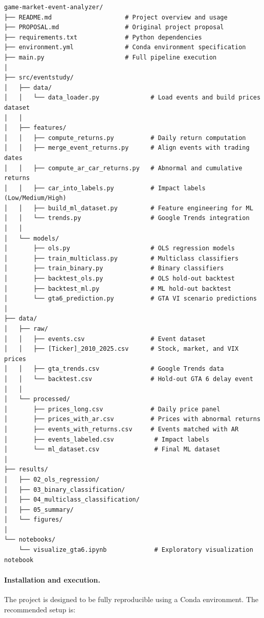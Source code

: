 \documentclass[11pt,a4paper]{article}
\begin{document}
\begin{verbatim}
game-market-event-analyzer/
├── README.md                    # Project overview and usage
├── PROPOSAL.md                  # Original project proposal
├── requirements.txt             # Python dependencies
├── environment.yml              # Conda environment specification
├── main.py                      # Full pipeline execution
│
├── src/eventstudy/
│   ├── data/
│   │   └── data_loader.py              # Load events and build prices dataset
│   │
│   ├── features/
│   │   ├── compute_returns.py          # Daily return computation
│   │   ├── merge_event_returns.py      # Align events with trading dates
│   │   ├── compute_ar_car_returns.py   # Abnormal and cumulative returns
│   │   ├── car_into_labels.py          # Impact labels (Low/Medium/High)
│   │   ├── build_ml_dataset.py         # Feature engineering for ML
│   │   └── trends.py                   # Google Trends integration
│   │
│   └── models/
│       ├── ols.py                      # OLS regression models
│       ├── train_multiclass.py         # Multiclass classifiers
│       ├── train_binary.py             # Binary classifiers
│       ├── backtest_ols.py             # OLS hold-out backtest
│       ├── backtest_ml.py              # ML hold-out backtest
│       └── gta6_prediction.py          # GTA VI scenario predictions
│
├── data/
│   ├── raw/
│   │   ├── events.csv                  # Event dataset
│   │   ├── [Ticker]_2010_2025.csv      # Stock, market, and VIX prices
│   │   ├── gta_trends.csv              # Google Trends data
│   │   └── backtest.csv                # Hold-out GTA 6 delay event
│   │
│   └── processed/
│       ├── prices_long.csv             # Daily price panel
│       ├── prices_with_ar.csv          # Prices with abnormal returns
│       ├── events_with_returns.csv     # Events matched with AR
│       ├── events_labeled.csv           # Impact labels
│       └── ml_dataset.csv               # Final ML dataset
│
├── results/
│   ├── 02_ols_regression/
│   ├── 03_binary_classification/
│   ├── 04_multiclass_classification/
│   ├── 05_summary/
│   └── figures/
│
└── notebooks/
    └── visualize_gta6.ipynb             # Exploratory visualization notebook
\end{verbatim}

\paragraph{Installation and execution.}

The project is designed to be fully reproducible using a Conda environment. The recommended setup is:
\end{document}
